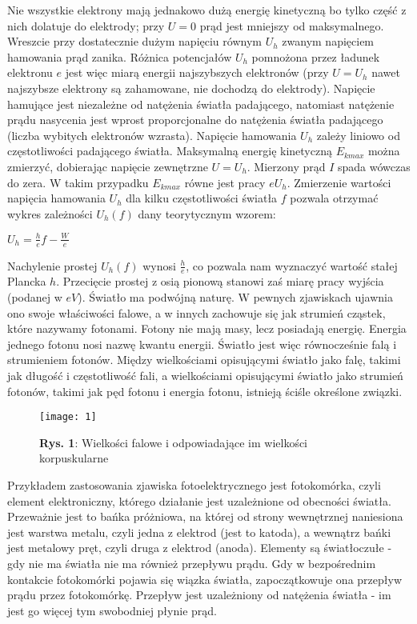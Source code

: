 \documentclass[12pt]{article}
\begin{document}
Nie wszystkie elektrony mają jednakowo dużą energię kinetyczną bo tylko część z nich dolatuje do elektrody; przy $U = 0$ prąd jest mniejszy od maksymalnego. Wreszcie przy dostatecznie dużym napięciu równym $U_h$ zwanym napięciem hamowania prąd zanika. Różnica potencjałów $U_h$ pomnożona przez ładunek elektronu $e$ jest więc miarą energii najszybszych elektronów (przy $U = U_h$ nawet najszybsze elektrony są zahamowane, nie dochodzą do elektrody). \newline
Napięcie hamujące jest niezależne od natężenia światła padającego, natomiast natężenie prądu nasycenia jest wprost proporcjonalne do natężenia światła padającego (liczba wybitych elektronów wzrasta). Napięcie hamowania $U_h$ zależy liniowo od częstotliwości padającego światła. \newpage
\noindent Maksymalną energię kinetyczną $E_{kmax}$ można zmierzyć, dobierając napięcie zewnętrzne $U=U_h$. Mierzony prąd $I$ spada wówczas do zera. W takim przypadku 
$E_{kmax}$ równe jest pracy $eU_h$. Zmierzenie wartości napięcia hamowania $U_h$ dla kilku częstotliwości światła $f$ pozwala otrzymać wykres zależności $U_h(f)$ dany teorytycznym wzorem:
\begin{center}
\Large $U_h=\frac{h}{e}f-\frac{W}{e}$
\end{center}
Nachylenie prostej $U_h(f)$ wynosi $\frac{h}{e}$, co pozwala nam wyznaczyć wartość stałej Plancka $h$. Przecięcie prostej z osią pionową stanowi zaś miarę pracy wyjścia (podanej w $eV$). \newline
Światło ma podwójną naturę. W pewnych zjawiskach ujawnia ono swoje właściwości falowe, \newline a w innych zachowuje się jak strumień cząstek, które nazywamy fotonami. Fotony nie mają masy, lecz posiadają energię. Energia jednego fotonu nosi nazwę kwantu energii. Światło jest więc równocześnie falą i strumieniem fotonów. Między wielkościami opisującymi światło jako falę, takimi jak długość i częstotliwość fali, a wielkościami opisującymi światło jako strumień fotonów, takimi jak pęd fotonu i energia fotonu, istnieją ściśle określone związki.
\begin{figure}[H]
\centering
\texttt{[image: 1]}
\caption*{\textbf{Rys. 1}: Wielkości falowe i odpowiadające im wielkości korpuskularne}
\end{figure} 
\noindent Przykładem zastosowania zjawiska fotoelektrycznego jest fotokomórka, czyli element elektroniczny, którego działanie jest uzależnione od obecności światła. Przeważnie jest to bańka próżniowa, na której od strony wewnętrznej naniesiona jest warstwa metalu, czyli jedna z elektrod (jest to katoda), a wewnątrz bańki jest metalowy pręt, czyli druga z elektrod (anoda). Elementy są światłoczułe - gdy nie ma światła nie ma również przepływu prądu. Gdy w bezpośrednim kontakcie fotokomórki pojawia się wiązka światła, zapoczątkowuje ona przepływ prądu przez fotokomórkę. Przepływ jest uzależniony od natężenia światła - im jest go więcej tym swobodniej płynie prąd. \newpage
\end{document}
